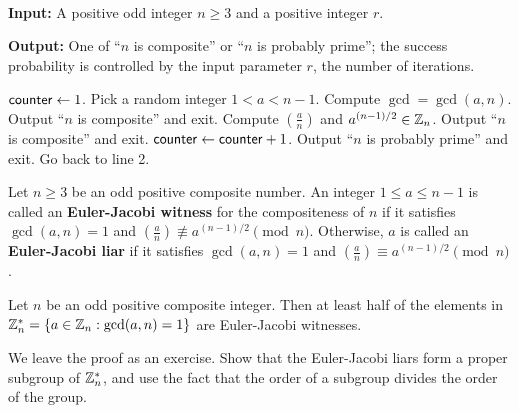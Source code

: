 \newpage 
\begin{algo}~

{\bf Input:} A positive odd integer $n \geq 3$ and a positive integer $r$. 

{\bf Output:} One of ``$n$ is composite'' or ``$n$ is probably prime''; the success probability is controlled by the input parameter $r$, the number of iterations. \vspace{0.5em}

\begin{algorithmic}[1]
\State ${\sf counter} \gets 1$. 
\State Pick a random integer $1 < a < n-1$. 
\State Compute $\gcd = \gcd(a, n)$. 
    \State Output ``$n$ is composite'' and exit.
\Else
    \State Compute $\left( \frac an \right)$ and $a^{(n-1)/2} \in \mathbb{Z}_n$. 
     
        \State Output ``$n$ is composite'' and exit. 
    \Else {}
        \State ${\sf counter} \gets {\sf counter} + 1$. 
         
            \State Output ``$n$ is probably prime'' and exit.
        \Else 
            \State Go back to line 2. 
        \EndIf 
    \EndIf
\EndIf
\end{algorithmic}
\end{algo}

\begin{defn}
Let $n \geq 3$ be an odd positive composite number. An integer $1 \leq a \leq n-1$ is called an 
{\bf Euler-Jacobi witness} for the compositeness of $n$ if it satisfies $\gcd(a, n) = 1$ and 
$\left( \frac an \right) \not\equiv a^{(n-1)/2} \pmod n$. Otherwise, $a$ is called an 
{\bf Euler-Jacobi liar} if it satisfies $\gcd(a, n) = 1$ and $\left( \frac an \right) 
\equiv a^{(n-1)/2} \pmod n$. 
\end{defn}

\begin{thm}
Let $n$ be an odd positive composite integer. Then at least half of the elements in $\mathbb{Z}_n^* 
= \{a \in \mathbb{Z}_n : \gcd(a, n) = 1\}$ are Euler-Jacobi witnesses.
\end{thm}
\begin{pf}
We leave the proof as an exercise. Show that the Euler-Jacobi liars
form a proper subgroup of $\mathbb{Z}_n^*$, and use the fact that the order of a subgroup divides the order 
of the group. 
\end{pf}

